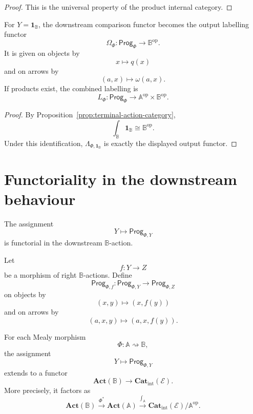 \begin{proof}
This is the universal property of the product internal category.
\end{proof}

\begin{corollary}
\label{cor:terminal-output-labelling}
For \(Y=\mathbf 1_{\mathbb B}\), the downstream comparison functor becomes the
output labelling functor
\[
\Omega_\Phi:
\mathsf{Prog}_\Phi\to\mathbb B^{\mathrm{op}}.
\]
It is given on objects by
\[
x\mapsto q(x)
\]
and on arrows by
\[
(a,x)\mapsto \omega(a,x).
\]
If products exist, the combined labelling is
\[
L_\Phi:
\mathsf{Prog}_\Phi
\to
\mathbb A^{\mathrm{op}}\times \mathbb B^{\mathrm{op}}.
\]
\end{corollary}

\begin{proof}
By Proposition~\ref{prop:terminal-action-category},
\[
\int_{\mathbb B}\mathbf 1_{\mathbb B}
\cong
\mathbb B^{\mathrm{op}}.
\]
Under this identification, \(\Lambda_{\Phi,\mathbf 1_{\mathbb B}}\) is exactly
the displayed output functor.
\end{proof}

\section{Functoriality in the downstream behaviour}
\label{sec:functoriality-downstream-behaviour}

The assignment
\[
Y\longmapsto \mathsf{Prog}_{\Phi,Y}
\]
is functorial in the downstream \(\mathbb B\)-action.

\begin{definition}
\label{def:induced-functor-program-categories}
Let
\[
f:Y\to Z
\]
be a morphism of right \(\mathbb B\)-actions. Define
\[
\mathsf{Prog}_{\Phi,f}:
\mathsf{Prog}_{\Phi,Y}\to\mathsf{Prog}_{\Phi,Z}
\]
on objects by
\[
(x,y)\mapsto(x,f(y))
\]
and on arrows by
\[
(a,x,y)\mapsto(a,x,f(y)).
\]
\end{definition}

\begin{theorem}
\label{thm:program-categories-functorial-in-Y}
For each Mealy morphism
\[
\Phi:\mathbb A\rightsquigarrow\mathbb B,
\]
the assignment
\[
Y\longmapsto \mathsf{Prog}_{\Phi,Y}
\]
extends to a functor
\[
\mathbf{Act}(\mathbb B)
\longrightarrow
\mathbf{Cat}_{\mathrm{int}}(\mathcal E).
\]
More precisely, it factors as
\[
\mathbf{Act}(\mathbb B)
\xrightarrow{\Phi^\ast}
\mathbf{Act}(\mathbb A)
\xrightarrow{\int_{\mathbb A}}
\mathbf{Cat}_{\mathrm{int}}(\mathcal E)/\mathbb A^{\mathrm{op}}.
\]
\end{theorem}

